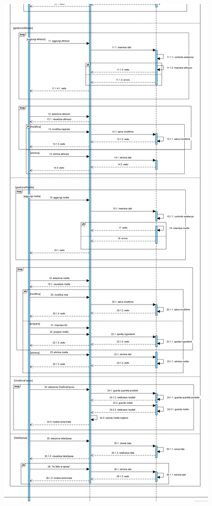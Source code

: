 \documentclass[a4paper, titlepage]{article}
\begin{document}
\includegraphics[scale=0.40]{Immagini/Sequence Diagram_Brew Day!_definitivo_2.png}

\newpage
\end{document}
